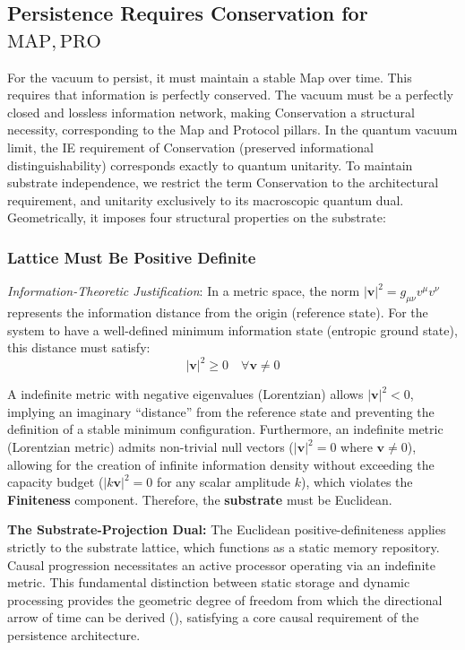 \subsection{Persistence Requires Conservation for \texorpdfstring{$\mathrm{MAP}, \mathrm{PRO}$}{MAP, PRO}}
\label{sec:conservation}

For the vacuum to persist, it must maintain a stable Map over time. This requires that information is perfectly conserved. The vacuum must be a perfectly closed and lossless information network, making Conservation a structural necessity, corresponding to the Map and Protocol pillars. In the quantum vacuum limit, the IE requirement of Conservation (preserved informational distinguishability) corresponds exactly to quantum unitarity. To maintain substrate independence, we restrict the term Conservation to the architectural requirement, and unitarity exclusively to its macroscopic quantum dual. Geometrically, it imposes four structural properties on the substrate:

\subsubsection{Lattice Must Be Positive Definite}
\label{subsec:positive_definite}
\textit{Information-Theoretic Justification}: In a metric space, the norm $|\mathbf{v}|^2 = g_{\mu\nu}v^\mu v^\nu$ represents the information distance from the origin (reference state). For the system to have a well-defined minimum information state (entropic ground state), this distance must satisfy:
\begin{equation}
    |\mathbf{v}|^2 \geq 0 \quad \forall \mathbf{v} \neq 0
\end{equation}

A indefinite metric with negative eigenvalues (Lorentzian) allows $|\mathbf{v}|^2 < 0$, implying an imaginary ``distance'' from the reference state and preventing the definition of a stable minimum configuration. Furthermore, an indefinite metric (Lorentzian metric) admits non-trivial null vectors ($|\mathbf{v}|^2 = 0$ where $\mathbf{v} \neq 0$), allowing for the creation of infinite information density without exceeding the capacity budget ($|k\mathbf{v}|^2 = 0$ for any scalar amplitude $k$), which violates the \textbf{Finiteness} component. Therefore, the \textbf{substrate} must be Euclidean.

\textbf{The Substrate-Projection Dual:}
The Euclidean positive-definiteness applies strictly to the substrate lattice, which functions as a static memory repository. Causal progression necessitates an active processor operating via an indefinite metric. This fundamental distinction between static storage and dynamic processing provides the geometric degree of freedom from which the directional arrow of time can be derived (), satisfying a core causal requirement of the persistence architecture.

